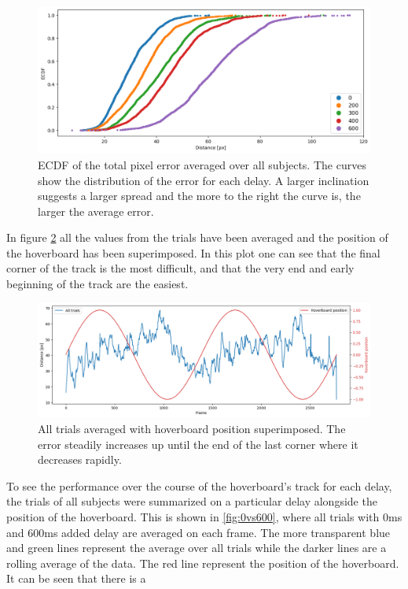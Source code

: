 \documentclass[nofilelist]{cslthse-msc}
\begin{document}
\begin{figure}[!hbt]
   \centering
   \includegraphics[scale=0.5]{images/ecdf.png} 
   \caption{ECDF of the total pixel error averaged over all subjects. The curves show the distribution of the error for each delay. A larger inclination suggests a larger spread and the more to the right the curve is, the larger the average error.}
   \label{fig:ecdf}
\end{figure}

In figure \ref{fig:hoverboard-pos} all the values from the trials have been averaged and the position of the hoverboard has been superimposed. In this plot one can see that the final corner of the track is the most difficult, and that the very end and early beginning of the track are the easiest. 

\begin{figure}[!hbt]
   \centering
   \includegraphics[scale=0.4]{images/hoverboard-pos.png} 
   \caption{All trials averaged with hoverboard position superimposed. The error steadily increases up until the end of the last corner where it decreases rapidly.}
   \label{fig:hoverboard-pos}
\end{figure}

To see the performance over the course of the hoverboard's track for each delay, the trials of all subjects were summarized on a particular delay alongside the position of the hoverboard. This is shown in \ref{fig:0vs600}, where all trials with 0ms and 600ms added delay are averaged on each frame. The more transparent blue and green lines represent the average over all trials while the darker lines are a rolling average of the data. The red line represent the position of the hoverboard.
It can be seen that there is a    
\end{document}

